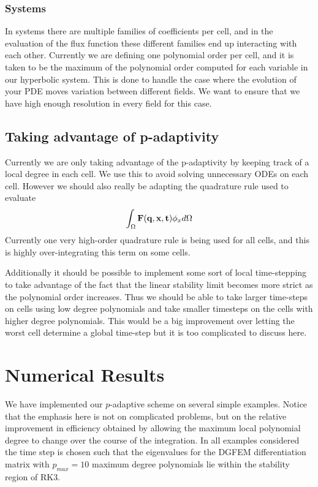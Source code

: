 \documentclass[10]{amsart}
\begin{document}
\subsubsection{Systems}
In systems there are multiple families of coefficients per cell, and in the evaluation of the 
flux function these different families end up interacting with each other. Currently we are defining
one polynomial order per cell, and it is taken to be the maximum of the polynomial order computed for each variable
in our hyperbolic system. This is done to handle the case where the evolution of your PDE moves variation between different
fields. We want to ensure that we have high enough resolution in every field for this case. 

\subsection{Taking advantage of p-adaptivity}
Currently we are only taking advantage of the p-adaptivity by keeping track
of a local degree in each cell. We use this to avoid solving unnecessary ODEs
on each cell. However we should also really be adapting the quadrature rule used to evaluate
$$\int_{\Omega}{\bf F(q,x,t)} \phi_x d\Omega$$
Currently one very high-order quadrature rule is being used for all cells, and this
is highly over-integrating this term on some cells. 

Additionally it should be possible to implement some sort of local time-stepping to take
advantage of the fact that the linear stability limit becomes more strict as the polynomial order increases.
Thus we should be able to take larger time-steps on cells using low degree polynomials
and take smaller timesteps on the cells with higher degree polynomials. This would be a big improvement
over letting the worst cell determine a global time-step but it is too complicated to discuss here.

\section{Numerical Results}

We have implemented our $p$-adaptive scheme on several simple examples. Notice that the emphasis here is not on complicated problems, but on the relative improvement in efficiency obtained by allowing the maximum local polynomial degree to change over the course of the integration. In all examples considered the time step is chosen such that the eigenvalues for the DGFEM differentiation matrix with $p_{max} = 10$ maximum degree polynomials lie within the stability region of RK3.
\end{document}
